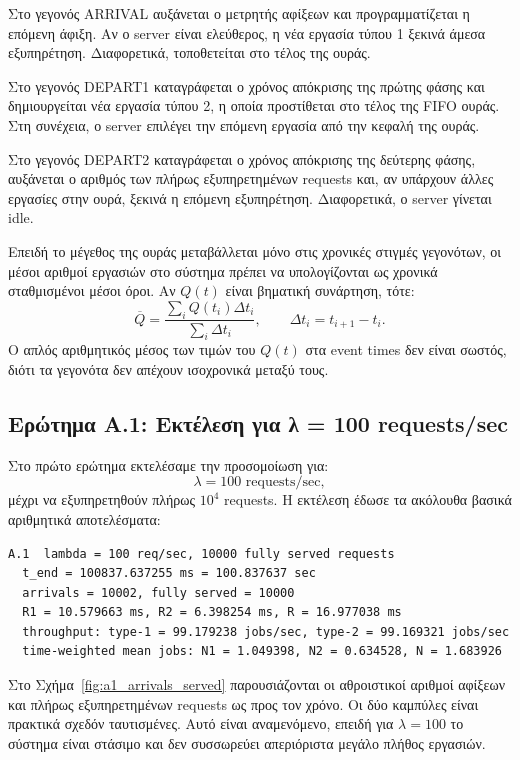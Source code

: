 \documentclass{article}
\begin{document}
Στο γεγονός ARRIVAL αυξάνεται ο μετρητής αφίξεων και προγραμματίζεται η επόμενη άφιξη. Αν ο server είναι ελεύθερος, η νέα εργασία τύπου 1 ξεκινά άμεσα εξυπηρέτηση. Διαφορετικά, τοποθετείται στο τέλος της ουράς.

Στο γεγονός DEPART1 καταγράφεται ο χρόνος απόκρισης της πρώτης φάσης και δημιουργείται νέα εργασία τύπου 2, η οποία προστίθεται στο τέλος της FIFO ουράς. Στη συνέχεια, ο server επιλέγει την επόμενη εργασία από την κεφαλή της ουράς.

Στο γεγονός DEPART2 καταγράφεται ο χρόνος απόκρισης της δεύτερης φάσης, αυξάνεται ο αριθμός των πλήρως εξυπηρετημένων requests και, αν υπάρχουν άλλες εργασίες στην ουρά, ξεκινά η επόμενη εξυπηρέτηση. Διαφορετικά, ο server γίνεται idle.

Επειδή το μέγεθος της ουράς μεταβάλλεται μόνο στις χρονικές στιγμές γεγονότων, οι μέσοι αριθμοί εργασιών στο σύστημα πρέπει να υπολογίζονται ως χρονικά σταθμισμένοι μέσοι όροι. Αν $Q(t)$ είναι βηματική συνάρτηση, τότε:
\[
    \overline{Q} =
    \frac{\sum_i Q(t_i)\Delta t_i}{\sum_i \Delta t_i},
    \qquad
    \Delta t_i = t_{i+1}-t_i.
\]
Ο απλός αριθμητικός μέσος των τιμών του $Q(t)$ στα event times δεν είναι σωστός, διότι τα γεγονότα δεν απέχουν ισοχρονικά μεταξύ τους.

\newpage
\subsection{Ερώτημα A.1: Εκτέλεση για λ = 100 requests/sec}

Στο πρώτο ερώτημα εκτελέσαμε την προσομοίωση για:
\[
    \lambda = 100 \text{ requests/sec},
\]
μέχρι να εξυπηρετηθούν πλήρως $10^4$ requests. Η εκτέλεση έδωσε τα ακόλουθα βασικά αριθμητικά αποτελέσματα:

\begin{verbatim}
A.1  lambda = 100 req/sec, 10000 fully served requests
  t_end = 100837.637255 ms = 100.837637 sec
  arrivals = 10002, fully served = 10000
  R1 = 10.579663 ms, R2 = 6.398254 ms, R = 16.977038 ms
  throughput: type-1 = 99.179238 jobs/sec, type-2 = 99.169321 jobs/sec
  time-weighted mean jobs: N1 = 1.049398, N2 = 0.634528, N = 1.683926
\end{verbatim}

Στο Σχήμα~\ref{fig:a1_arrivals_served} παρουσιάζονται οι αθροιστικοί αριθμοί αφίξεων και πλήρως εξυπηρετημένων requests ως προς τον χρόνο. Οι δύο καμπύλες είναι πρακτικά σχεδόν ταυτισμένες. Αυτό είναι αναμενόμενο, επειδή για $\lambda=100$ το σύστημα είναι στάσιμο και δεν συσσωρεύει απεριόριστα μεγάλο πλήθος εργασιών.
\end{document}
